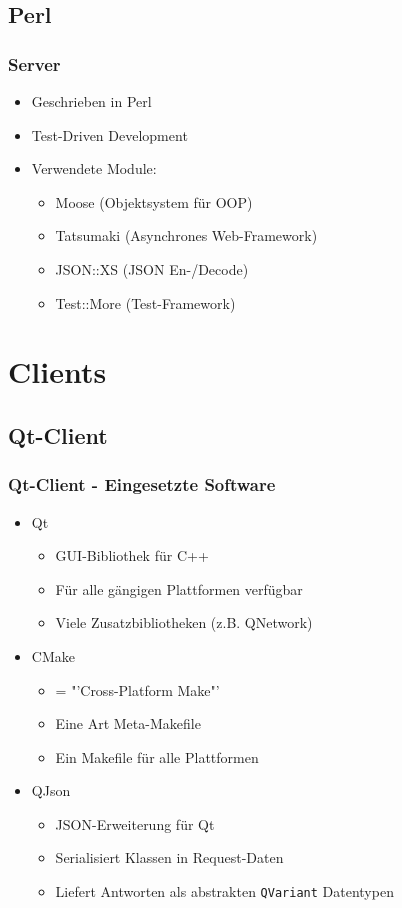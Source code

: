 \documentclass{beamer}
\begin{document}
\subsection{Perl}
\begin{frame}[fragile]
\frametitle{Server}
\begin{itemize}
\item Geschrieben in Perl
\item Test-Driven Development
\item Verwendete Module:
\begin{itemize}
\item Moose (Objektsystem für OOP)
\item Tatsumaki (Asynchrones Web-Framework)
\item JSON::XS (JSON En-/Decode)
\item Test::More (Test-Framework)
\end{itemize}
\end{itemize}
\end{frame}

\section{Clients}

\subsection{Qt-Client}
\begin{frame}[fragile]
\frametitle{Qt-Client - Eingesetzte Software}
\begin{itemize}
\item Qt
\begin{itemize}
\item GUI-Bibliothek für C++
\item Für alle gängigen Plattformen verfügbar
\item Viele Zusatzbibliotheken (z.B. QNetwork)
\end{itemize}
\item CMake
\begin{itemize}
\item = "'Cross-Platform Make"'
\item Eine Art Meta-Makefile
\item Ein Makefile für alle Plattformen
\end{itemize}
\item QJson
\begin{itemize}
\item JSON-Erweiterung für Qt
\item Serialisiert Klassen in Request-Daten
\item Liefert Antworten als abstrakten \texttt{QVariant} Datentypen
\end{itemize}
\end{itemize}
\end{frame}
\end{document}
